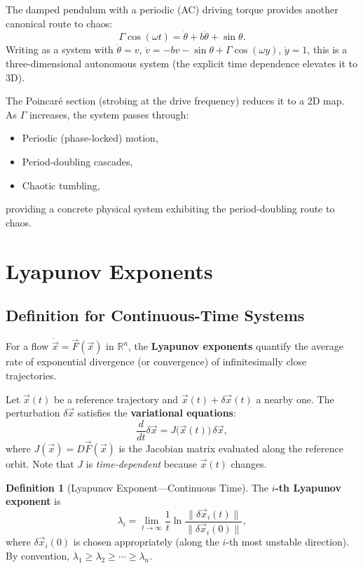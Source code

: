 \documentclass[11pt,letterpaper]{article}
\theoremstyle{definition}
\newtheorem{definition}{Definition}[section]
\theoremstyle{plain}
\theoremstyle{remark}
\begin{document}
The damped pendulum with a periodic (AC) driving torque provides another
canonical route to chaos:
\begin{equation}
  \Gamma\cos(\omega t) = \ddot{\theta} + b\dot{\theta} + \sin\theta.
\end{equation}
Writing as a system with $\dot{\theta} = v$, $\dot{v} = -bv - \sin\theta +
\Gamma\cos(\omega y)$, $\dot{y} = 1$, this is a three-dimensional
autonomous system (the explicit time dependence elevates it to 3D).

The Poincar\'e section (strobing at the drive frequency) reduces it to a
2D map.  As $\Gamma$ increases, the system passes through:
\begin{itemize}[leftmargin=2em]
\item Periodic (phase-locked) motion,
\item Period-doubling cascades,
\item Chaotic tumbling,
\end{itemize}
providing a concrete physical system exhibiting the period-doubling route
to chaos.


\section{Lyapunov Exponents}\label{sec:lyapunov-flows}

\subsection{Definition for Continuous-Time Systems}

For a flow $\dot{\vec{x}} = \vec{F}(\vec{x})$ in $\mathbb{R}^n$, the
\textbf{Lyapunov exponents} quantify the average rate of exponential
divergence (or convergence) of infinitesimally close trajectories.

Let $\vec{x}(t)$ be a reference trajectory and $\vec{x}(t)+\delta\vec{x}(t)$
a nearby one.  The perturbation $\delta\vec{x}$ satisfies the
\textbf{variational equations}:
\begin{equation}\label{eq:variational}
  \frac{d}{dt}\delta\vec{x} = J\bigl(\vec{x}(t)\bigr)\,\delta\vec{x},
\end{equation}
where $J(\vec{x}) = D\vec{F}(\vec{x})$ is the Jacobian matrix evaluated
along the reference orbit.  Note that $J$ is \emph{time-dependent} because
$\vec{x}(t)$ changes.

\begin{definition}[Lyapunov Exponent---Continuous Time]
The \textbf{$i$-th Lyapunov exponent} is
\begin{equation}\label{eq:lyap-def}
  \lambda_i = \lim_{t\to\infty}\frac{1}{t}\ln
  \frac{\|\delta\vec{x}_i(t)\|}{\|\delta\vec{x}_i(0)\|},
\end{equation}
where $\delta\vec{x}_i(0)$ is chosen appropriately (along the $i$-th
most unstable direction).  By convention, $\lambda_1 \ge \lambda_2 \ge
\cdots \ge \lambda_n$.
\end{definition}
\end{document}
